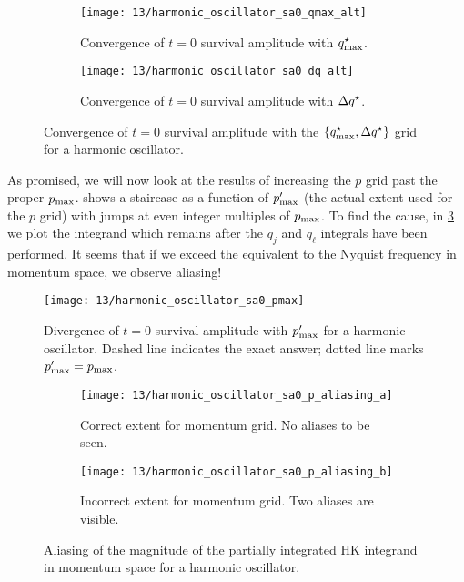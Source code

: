 \begin{figure}
	\setlength{\figspacing}{5 mm}
	\centering
	\begin{subfigure}[b]{\textwidth}
		\texttt{[image: 13/harmonic\_oscillator\_sa0\_qmax\_alt]}
		\caption{
			Convergence of $t = 0$ survival amplitude with $q_\mathrm{max}^\star$.
		}
		\vspace{\figspacing}
	\end{subfigure}
	\begin{subfigure}[b]{\textwidth}
		\texttt{[image: 13/harmonic\_oscillator\_sa0\_dq\_alt]}
		\caption{
			Convergence of $t = 0$ survival amplitude with $\Delta q^\star$.
		}
	\end{subfigure}
	\caption[
		Harmonic oscillator survival amplitude convergence with position grids \cont
	]{
		Convergence of $t = 0$ survival amplitude with the $\{ q_\mathrm{max}^\star, \Delta q^\star \}$ grid for a harmonic oscillator.
		\explainplotsazero{}
	}
	\label{fig:harmonic-oscillator-survival-zero-q-b}
\end{figure}

As promised, we will now look at the results of increasing the $p$ grid past the proper $p_\mathrm{max}$.
 shows a staircase as a function of $p_\mathrm{max}'$ (the actual extent used for the $p$ grid) with jumps at even integer multiples of $p_\mathrm{max}$.
To find the cause, in \cref{fig:harmonic-oscillator-survival-zero-p-aliasing} we plot the integrand which remains after the $q_j$ and $q_\ell$ integrals have been performed.
It seems that if we exceed the equivalent to the Nyquist frequency in momentum space, we observe aliasing!

\begin{figure}
	\centering
	\texttt{[image: 13/harmonic\_oscillator\_sa0\_pmax]}
	\caption[
		Harmonic oscillator survival amplitude divergence with momentum grid
	]{
		Divergence of $t = 0$ survival amplitude with $p_\mathrm{max}'$ for a harmonic oscillator.
		Dashed line indicates the exact answer; dotted line marks $p_\mathrm{max}' = p_\mathrm{max}$.
	}
	\label{fig:harmonic-oscillator-survival-zero-pmax}
\end{figure}

\begin{figure}
	\centering
	\begin{subfigure}{0.48\textwidth}
		\texttt{[image: 13/harmonic\_oscillator\_sa0\_p\_aliasing\_a]}
		\caption{
			Correct extent for momentum grid.
			No aliases to be seen.
		}
	\end{subfigure}
	\hfill
	\begin{subfigure}{0.48\textwidth}
		\texttt{[image: 13/harmonic\_oscillator\_sa0\_p\_aliasing\_b]}
		\caption{
			Incorrect extent for momentum grid.
			Two aliases are visible.
		}
	\end{subfigure}
	\caption[
		Aliasing of integrand in momentum space
	]{
		Aliasing of the magnitude of the partially integrated HK integrand in momentum space for a harmonic oscillator.
		\explainsketch{}
		\explainparadiff{}
	}
	\label{fig:harmonic-oscillator-survival-zero-p-aliasing}
\end{figure}

